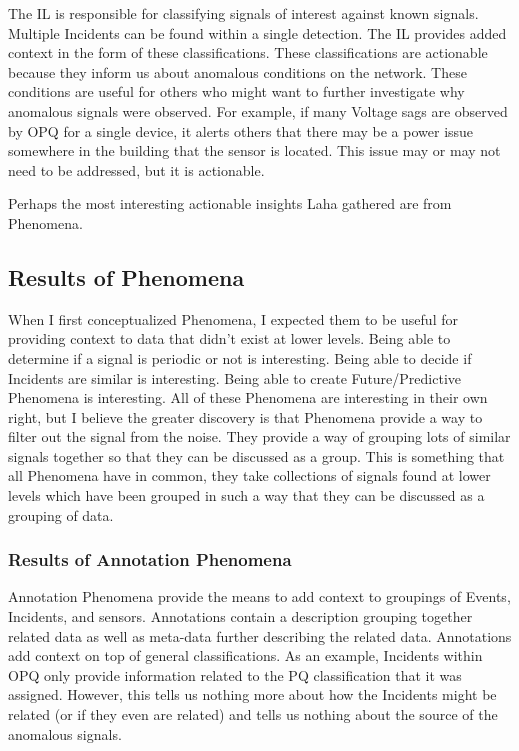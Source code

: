 The IL is responsible for classifying signals of interest against known signals. Multiple Incidents can be found within a single detection. The IL provides added context in the form of these classifications. These classifications are actionable because they inform us about anomalous conditions on the network. These conditions are useful for others who might want to further investigate why anomalous signals were observed. For example, if many Voltage sags are observed by OPQ for a single device, it alerts others that there may be a power issue somewhere in the building that the sensor is located. This issue may or may not need to be addressed, but it is actionable.

Perhaps the most interesting actionable insights Laha gathered are from Phenomena.

\subsection{Results of Phenomena}\label{subsec:results-of-phenomena}

When I first conceptualized Phenomena, I expected them to be useful for providing context to data that didn't exist at lower levels. Being able to determine if a signal is periodic or not is interesting. Being able to decide if Incidents are similar is interesting. Being able to create Future/Predictive Phenomena is interesting. All of these Phenomena are interesting in their own right, but I believe the greater discovery is that Phenomena provide a way to filter out the signal from the noise. They provide a way of grouping lots of similar signals together so that they can be discussed as a group. This is something that all Phenomena have in common, they take collections of signals found at lower levels which have been grouped in such a way that they can be discussed as a grouping of data.

\subsubsection{Results of Annotation Phenomena}

Annotation Phenomena provide the means to add context to groupings of Events, Incidents, and sensors. Annotations contain a description grouping together related data as well as meta-data further describing the related data. Annotations add context on top of general classifications. As an example, Incidents within OPQ only provide information related to the PQ classification that it was assigned. However, this tells us nothing more about how the Incidents might be related (or if they even are related) and tells us nothing about the source of the anomalous signals.

